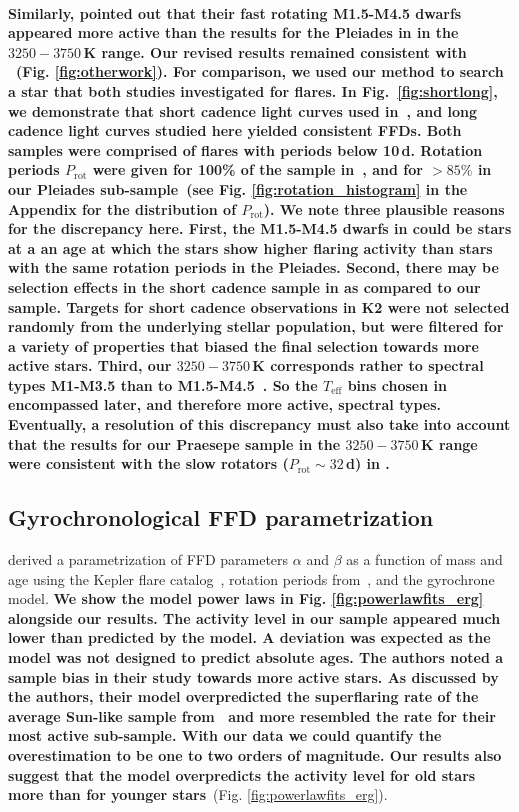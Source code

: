 \documentclass{aa}
\begin{document}
\\
\textbf{Similarly, \citet{raetz2020} pointed out that their fast rotating M1.5-M4.5 dwarfs appeared more active than the results for the Pleiades in  in the $3250-3750\,$K range. Our revised results remained consistent with ~(Fig. \ref{fig:otherwork}). For comparison, we used our method to search a star that both studies investigated for flares. In Fig.~\ref{fig:shortlong}, we demonstrate that short cadence light curves used in~\citet{raetz2020}, and long cadence light curves studied here yielded consistent FFDs. Both samples were comprised of flares with periods below 10\,d. Rotation periods $P_\mathrm{rot}$ were given for 100\% of the sample in~\cite{raetz2020}, and for \mbox{$>85\%$} in our Pleiades sub-sample~(see Fig. \ref{fig:rotation_histogram} in the Appendix for the distribution of $P_\mathrm{rot}$). We note three plausible reasons for the discrepancy here. First, the M1.5-M4.5 dwarfs in \citet{raetz2020} could be stars at a an age at which the stars show higher flaring activity than stars with the same rotation periods in the Pleiades. Second, there may be selection effects in the short cadence sample in \citet{raetz2020} as compared to our sample. Targets for short cadence observations in K2 were not selected randomly from the underlying stellar population, but were filtered for a variety of properties that biased the final selection towards more active stars. Third, our $3250-3750\,$K corresponds rather to spectral types M1-M3.5 than to M1.5-M4.5~\citep{pecaut_intrinsic_2013}. So the $T_\mathrm{eff}$ bins chosen in~\citet{raetz2020} encompassed later, and therefore more active, spectral types. Eventually, a resolution of this discrepancy must also take into account that the results for our Praesepe sample in the  $3250-3750\,$K range were consistent with the slow rotators ($P_\mathrm{rot}\sim32\,$d) in \citet{raetz2020}.}
\subsection{Gyrochronological FFD parametrization}
\label{sec:davenport}
\citet{davenport2019} derived a parametrization of FFD parameters $\alpha$ and $\beta$ as a function of mass and age using the Kepler flare catalog~\citep{davenport_kepler_2016}, rotation periods from~\citet{mcquillan2014}, and the \citet{mamajek2008} gyrochrone model. \textbf{We show the model power laws in Fig. \ref{fig:powerlawfits_erg} alongside our results. The activity level in our sample appeared much lower than predicted by the model. A deviation was expected as the model was not designed to predict absolute ages. The authors noted a sample bias in their study towards more active stars. As discussed by the authors, their model overpredicted the superflaring rate of the average Sun-like sample from~\citet{shibayama2013} and more resembled the rate for their most active sub-sample. With our data we could quantify the overestimation to be one to two orders of magnitude. Our results also suggest that the model overpredicts the activity level for old stars more than for younger stars}~(Fig. \ref{fig:powerlawfits_erg}).
\end{document}
